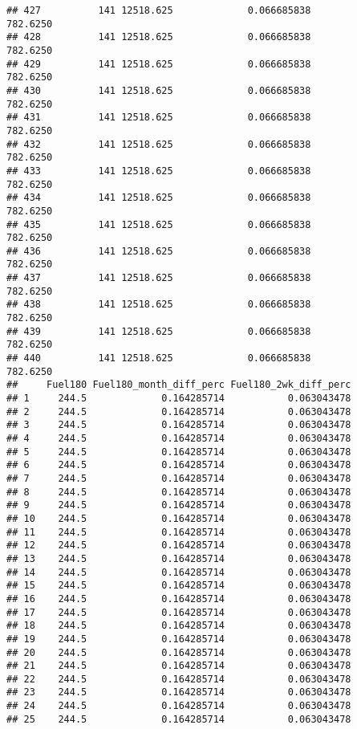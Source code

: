 \documentclass[]{article}
\begin{document}
\begin{verbatim}
## 427          141 12518.625             0.066685838           782.6250
## 428          141 12518.625             0.066685838           782.6250
## 429          141 12518.625             0.066685838           782.6250
## 430          141 12518.625             0.066685838           782.6250
## 431          141 12518.625             0.066685838           782.6250
## 432          141 12518.625             0.066685838           782.6250
## 433          141 12518.625             0.066685838           782.6250
## 434          141 12518.625             0.066685838           782.6250
## 435          141 12518.625             0.066685838           782.6250
## 436          141 12518.625             0.066685838           782.6250
## 437          141 12518.625             0.066685838           782.6250
## 438          141 12518.625             0.066685838           782.6250
## 439          141 12518.625             0.066685838           782.6250
## 440          141 12518.625             0.066685838           782.6250
##     Fuel180 Fuel180_month_diff_perc Fuel180_2wk_diff_perc
## 1     244.5             0.164285714           0.063043478
## 2     244.5             0.164285714           0.063043478
## 3     244.5             0.164285714           0.063043478
## 4     244.5             0.164285714           0.063043478
## 5     244.5             0.164285714           0.063043478
## 6     244.5             0.164285714           0.063043478
## 7     244.5             0.164285714           0.063043478
## 8     244.5             0.164285714           0.063043478
## 9     244.5             0.164285714           0.063043478
## 10    244.5             0.164285714           0.063043478
## 11    244.5             0.164285714           0.063043478
## 12    244.5             0.164285714           0.063043478
## 13    244.5             0.164285714           0.063043478
## 14    244.5             0.164285714           0.063043478
## 15    244.5             0.164285714           0.063043478
## 16    244.5             0.164285714           0.063043478
## 17    244.5             0.164285714           0.063043478
## 18    244.5             0.164285714           0.063043478
## 19    244.5             0.164285714           0.063043478
## 20    244.5             0.164285714           0.063043478
## 21    244.5             0.164285714           0.063043478
## 22    244.5             0.164285714           0.063043478
## 23    244.5             0.164285714           0.063043478
## 24    244.5             0.164285714           0.063043478
## 25    244.5             0.164285714           0.063043478

\end{verbatim}
\end{document}
